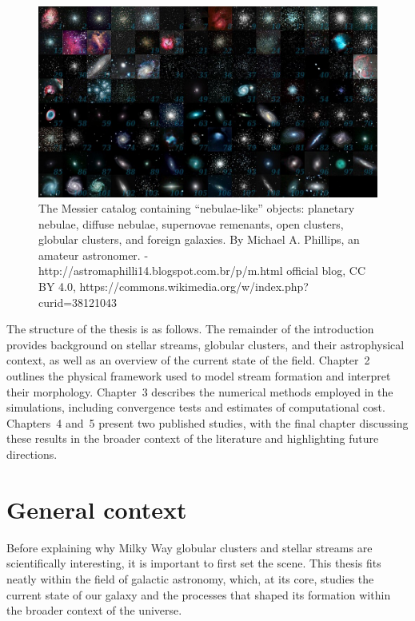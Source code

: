 \begin{figure}
    \centering
    \includegraphics[width=\linewidth]{images/All_messier_objects.jpg}
    \caption[Messer objects]{The Messier catalog containing ``nebulae-like'' objects: planetary nebulae, diffuse nebulae, supernovae remenants, open clusters, globular clusters, and foreign galaxies. By Michael A. Phillips, an amateur astronomer. - http://astromaphilli14.blogspot.com.br/p/m.html official blog, CC BY 4.0, https://commons.wikimedia.org/w/index.php?curid=38121043}
    \label{fig:All_messier_objects}
\end{figure}

The structure of the thesis is as follows. The remainder of the introduction provides background on stellar streams, globular clusters, and their astrophysical context, as well as an overview of the current state of the field. Chapter~2 outlines the physical framework used to model stream formation and interpret their morphology. Chapter~3 describes the numerical methods employed in the simulations, including convergence tests and estimates of computational cost. Chapters~4 and~5 present two published studies, with the final chapter discussing these results in the broader context of the literature and highlighting future directions.

\section{General context}
    Before explaining why Milky Way globular clusters and stellar streams are scientifically interesting, it is important to first set the scene. This thesis fits neatly within the field of galactic astronomy, which, at its core, studies the current state of our galaxy and the processes that shaped its formation within the broader context of the universe.


